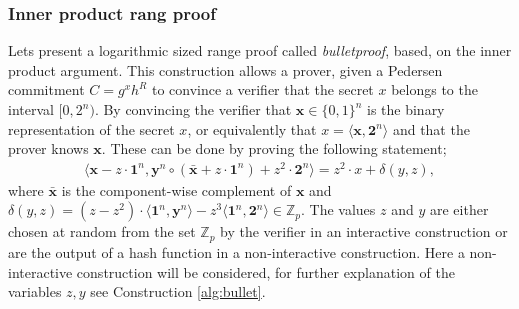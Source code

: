 


\subsubsection*{Inner product rang proof}
Lets present a logarithmic sized range proof called \textit{bulletproof}, based, on the inner product argument. This construction allows a prover, given a Pedersen commitment $C=g^x h^R$ to convince a verifier that the secret $x$ belongs to the interval $[0,2^n)$. By convincing the verifier that  $\bm{x}\in\{0,1\}^n$ is the binary representation of the secret $x$, or equivalently that $x= \langle \bm{x},\mathbf{2}^n\rangle $ and that the prover knows $\bm{x}$.
These can be done by proving the following statement;
\begin{align}
    \big\langle \bm{x} -z\cdot \bm{1}^n, \bm{y}^n\circ (\bm{\bar{x}} + z \cdot\bm{1}^n) + z^2\cdot\bm{2}^n \big\rangle = z^2\cdot x+ \delta(y,z),
    \label{eq:range_non_zero}
\end{align}
where $\bar{\bm{x}}$ is the component-wise complement of $\bm{x}$ and $\delta(y,z) = (z-z^2)\cdot\langle\bm{1}^n,\bm{y}^n\rangle-z^3\langle \bm{1}^n,\bm{2}^n\rangle\in\mathds{Z}_p$.
The values $z$ and $y$ are either chosen at random from the set $\mathds{Z}_p$ by the verifier in an interactive construction or are the output of a hash function in a non-interactive construction. Here a non-interactive construction will be considered, for further explanation of the variables $z,y$ see Construction \ref{alg:bullet}.

